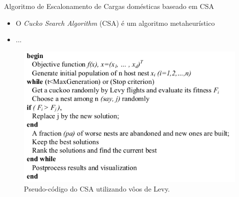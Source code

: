 \begin{frame}
  \begin{block}{Algoritmo de Escalonamento de Cargas domésticas baseado em CSA}
    \begin{itemize}
      \item O \textit{Cucko Search Algorithm} (CSA) é um algoritmo
      metaheurístico
      \item ...
    \end{itemize}
  \end{block}
  \begin{figure}[h]
  	\begin{center}
      \includegraphics [scale=0.35]{./Figures/csa}
      \caption {Pseudo-código do CSA utilizando vôos de Levy.}
  	\end{center}
  \end{figure}
\end{frame}

